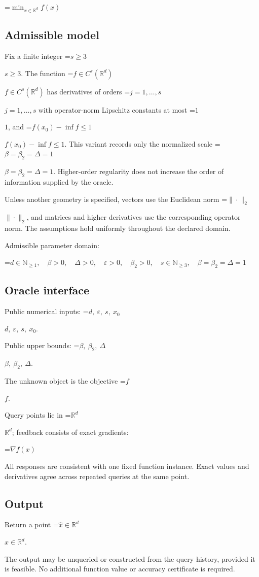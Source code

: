 \documentclass[10pt,a4paper]{article}
\newcommand{\AtlasMath}[1]{\par\begingroup\centering\setbox0=\hbox{$\displaystyle #1$}\ifdim\wd0>1.4\linewidth\typeout{ATLAS WIDE FORMULA: \the\wd0}\fi\ifdim\wd0>\linewidth\resizebox{\linewidth}{!}{\box0}\else\box0\fi\par\endgroup}
\newcommand{\AtlasInlineMath}[1]{\begingroup\setbox0=\hbox{$#1$}\ifdim\wd0>.4\linewidth\endgroup\AtlasMath{#1}\else\endgroup$#1$\fi}
\begin{document}
\AtlasMath{\min_{x\in \mathbb{R}^d}f(x)}


\subsection{Admissible model}
Fix a finite integer \AtlasInlineMath{s\ge3}. The function \AtlasInlineMath{f\in C^s(\mathbb R^d)} has derivatives of orders \AtlasInlineMath{j=1,\ldots,s} with operator-norm Lipschitz constants at most \AtlasInlineMath{1}, and \AtlasInlineMath{f(x_0)-\inf f\le1}. This variant records only the normalized scale \AtlasInlineMath{\beta=\beta_2=\Delta=1}. Higher-order regularity does not increase the order of information supplied by the oracle.

Unless another geometry is specified, vectors use the Euclidean norm \AtlasInlineMath{\|\cdot\|_2}, and matrices and higher derivatives use the corresponding operator norm. The assumptions hold uniformly throughout the declared domain.

Admissible parameter domain:


\AtlasMath{d\in\mathbb{N}_{\ge1},\quad \beta>0,\quad \Delta>0,\quad \varepsilon>0,\quad \beta_2>0,\quad s\in\mathbb{N}_{\ge3},\quad \beta=\beta_2=\Delta=1}


\subsection{Oracle interface}
Public numerical inputs: \AtlasInlineMath{d,\ \varepsilon,\ s,\ x_0}.

Public upper bounds: \AtlasInlineMath{\beta,\ \beta_2,\ \Delta}.

The unknown object is the objective \AtlasInlineMath{f}.

Query points lie in \AtlasInlineMath{\mathbb{R}^d}; feedback consists of exact gradients:


\AtlasMath{\nabla f(x)}


All responses are consistent with one fixed function instance. Exact values and derivatives agree across repeated queries at the same point.

\subsection{Output}
Return a point \AtlasInlineMath{\widehat x\in\mathbb R^d}.

The output may be unqueried or constructed from the query history, provided it is feasible. No additional function value or accuracy certificate is required.
\end{document}
